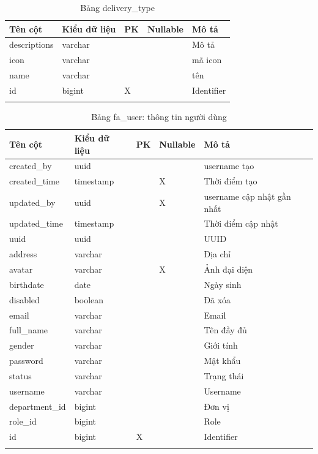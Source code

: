\documentclass[report.tex]{subfiles}
\begin{document}
\begin{table}[!htb]
\begin{longtable}{|p{3cm}|p{3cm}|p{1cm}|p{1.6cm}|p{6cm}|}
\hline
\textbf{Tên cột} & \textbf{Kiểu dữ liệu} & \textbf{PK} & \textbf{Nullable} & \textbf{Mô tả} \\
\hline
descriptions & varchar & & & Mô tả \\
icon & varchar & & & mã icon \\
name & varchar & & & tên\\
id & bigint & X & & Identifier \\
\hline
\caption[Bảng delivery\_type]{Bảng delivery\_type}
\end{longtable}
\end{table}
\FloatBarrier

\begin{table}[!htb]
\begin{longtable}{|p{3cm}|p{3cm}|p{1cm}|p{1.6cm}|p{6cm}|}
\hline
\textbf{Tên cột} & \textbf{Kiểu dữ liệu} & \textbf{PK} & \textbf{Nullable} & \textbf{Mô tả} \\
\hline
created\_by & uuid & & & username tạo \\
created\_time & timestamp & & X & Thời điểm tạo \\
updated\_by & uuid & & X & username cập nhật gần nhất \\ 
updated\_time & timestamp & & & Thời điểm cập nhật \\
uuid & uuid & & & UUID \\
address & varchar & & & Địa chỉ \\
avatar & varchar & & X & Ảnh đại diện \\
birthdate & date & & & Ngày sinh \\
disabled & boolean & & & Đã xóa \\
email & varchar & & & Email \\
full\_name & varchar & & & Tên đầy đủ \\
gender & varchar & & & Giới tính \\
password & varchar & & & Mật khẩu \\
status & varchar & & & Trạng thái \\
username & varchar & & & Username \\
department\_id & bigint & & & Đơn vị \\
role\_id & bigint & & & Role \\
id & bigint & X & & Identifier \\
\hline
\caption[Bảng fa\_user]{Bảng fa\_user: thông tin người dùng}
\end{longtable}
\end{table}
\FloatBarrier
\end{document}
